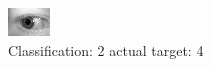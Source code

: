 \begin{figure}[h!]
\begin{center}
\includegraphics[width=0.60\columnwidth]{figures/ID836_class_2_target_4.png}
\end{center}
\caption{ Classification: 2 actual target: 4}
\label{fig:ID836_class_2_target_4}
\end{figure}
